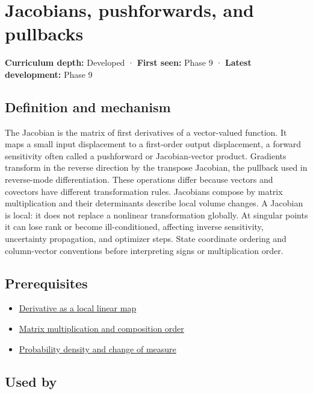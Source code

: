 \hypertarget{appendix-d8a7ddb675eb}{}\label{referencestart:appendix-d8a7ddb675eb}
\section{Jacobians, pushforwards, and pullbacks}\label{appendix-d8a7ddb675eb-jacobians-pushforwards-and-pullbacks}

\textbf{Curriculum depth:} Developed · \textbf{First seen:} Phase 9 · \textbf{Latest development:} Phase 9

\subsection{Definition and mechanism}\label{appendix-d8a7ddb675eb-definition-and-mechanism}

The Jacobian is the matrix of first derivatives of a vector-valued function. It maps a small input displacement to a first-order output displacement, a forward sensitivity often called a pushforward or Jacobian-vector product. Gradients transform in the reverse direction by the transpose Jacobian, the pullback used in reverse-mode differentiation. These operations differ because vectors and covectors have different transformation rules. Jacobians compose by matrix multiplication and their determinants describe local volume changes. A Jacobian is local: it does not replace a nonlinear transformation globally. At singular points it can lose rank or become ill-conditioned, affecting inverse sensitivity, uncertainty propagation, and optimizer steps. State coordinate ordering and column-vector conventions before interpreting signs or multiplication order.

\subsection{Prerequisites}\label{appendix-d8a7ddb675eb-prerequisites}

\begin{itemize}
\tightlist
\item
  \hyperref[appendix-7bc181935c42]{Derivative as a local linear map}
\item
  \hyperref[appendix-ab31ef447dbf]{Matrix multiplication and composition order}
\item
  \hyperref[appendix-4815cd87ab8b]{Probability density and change of measure}
\end{itemize}

\subsection{Used by}\label{appendix-d8a7ddb675eb-used-by}

